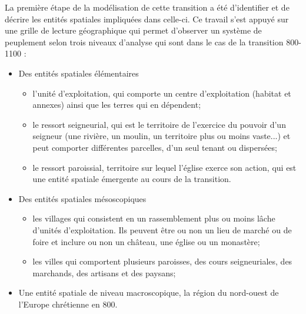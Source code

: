 La première étape de la modélisation de cette transition a été d'identifier et de décrire les entités spatiales impliquées dans celle-ci.
Ce travail s'est appuyé sur une grille de lecture géographique qui permet d'observer un système de peuplement selon trois niveaux d'analyse qui sont dans le cas de la transition 800-1100 :
\begin{itemize}
	\item Des entités spatiales élémentaires
	\begin{itemize}
		\item l'unité d'exploitation, qui comporte un centre d'exploitation (habitat et	annexes) ainsi que les terres qui en dépendent;
		\item le ressort seigneurial, qui est le territoire de l'exercice du pouvoir d'un	seigneur (une rivière, un moulin, un territoire plus ou moins vaste...) et peut comporter différentes parcelles, d'un seul tenant ou dispersées;
		\item le ressort paroissial, territoire sur lequel l'église exerce son action, qui est une entité spatiale émergente au cours de la transition.
	\end{itemize} 
	
	\item Des entités spatiales mésoscopiques
	\begin{itemize}
		\item 	les villages qui consistent en un rassemblement plus ou moins lâche d'unités d'exploitation. Ils peuvent être ou non un lieu de marché ou de foire et inclure ou non un château, une église ou un monastère;
		\item les villes qui comportent plusieurs paroisses, des cours seigneuriales, des marchands, des artisans et des paysans;
	\end{itemize}
	
	\item Une entité spatiale de niveau macroscopique, la région du nord-ouest de l'Europe chrétienne en 800.
\end{itemize}

